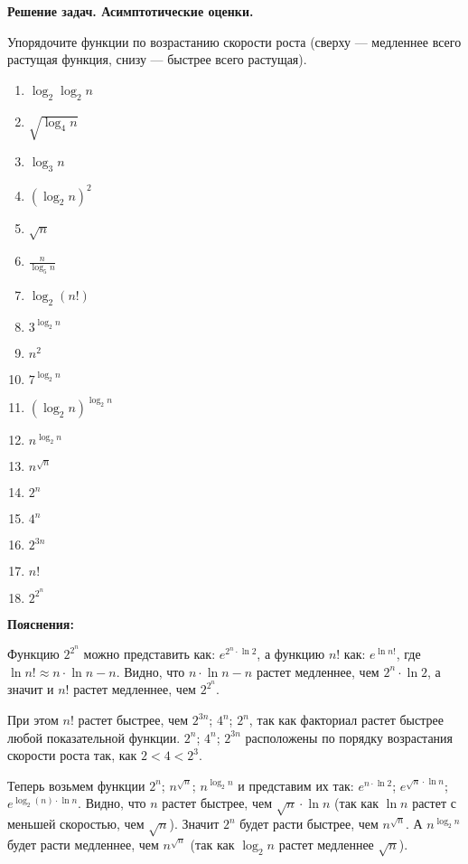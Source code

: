 \documentclass [a4paper,12pt] {report} 		%
\begin{document}
{\bfseries Решение задач. Асимптотические оценки.}

Упорядочите функции по возрастанию скорости роста (сверху — медленнее всего растущая функция, снизу — быстрее всего растущая).

\begin {enumerate}
  \item $\log_{2}\log_{2}n$
  \item $\sqrt{\log_{4}n}$
  \item $\log_{3}n$
  \item $(\log_{2}n)^2$
  \item $\sqrt{n}$
  \item $\frac{n}{\log_{5}n}$
  \item $\log_{2}(n!)$
  \item $3^{\log_{2}n}$
  \item $n^2$
  \item $7^{\log_{2}n}$
  \item $(\log_{2}n)^{\log_{2}n}$
  \item $n^{\log_{2}n}$
  \item $n^{\sqrt{n}}$
  \item $2^n$
  \item $4^n$
  \item $2^{3n}$
  \item $n!$
  \item $2^{2^n}$
\end {enumerate}

{\bfseries Пояснения:}

Функцию $2^{2^n}$ можно представить как: $e^{{2^n} \cdot \ln2}$, а функцию $n!$ как: $e^{\ln{n!}}$, где $\ln{n!} \approx n \cdot \ln{n} - n$. Видно, что $n \cdot \ln{n} - n$ растет медленнее, чем ${2^n} \cdot \ln2$, а значит и $n!$ растет медленнее, чем $2^{2^n}$.

При этом $n!$ растет быстрее, чем $2^{3n}$; $4^n$; $2^n$, так как факториал растет быстрее любой показательной функции. $2^n$; $4^n$; $2^{3n}$ расположены по порядку возрастания скорости роста так, как $2 < 4 < 2^3$.

Теперь возьмем функции $2^n$; $n^{\sqrt{n}}$; $n^{\log_{2}n}$ и представим их так: $e^{n \cdot \ln2}$; $e^{\sqrt{n} \cdot \ln{n}}$; $e^{\log_{2}(n) \cdot \ln{n}}$. Видно, что $n$ растет быстрее, чем $\sqrt{n} \cdot \ln{n}$ (так как $\ln{n}$ растет с меньшей скоростью, чем $\sqrt{n}$). Значит $2^n$ будет расти быстрее, чем $n^{\sqrt{n}}$. А $n^{\log_{2}n}$ будет расти медленнее, чем $n^{\sqrt{n}}$ (так как $\log_{2}n$ растет медленнее $\sqrt{n}$).
\end{document}
